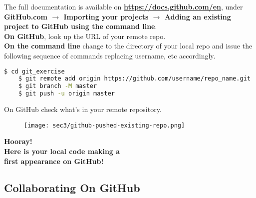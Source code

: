 \begin{frame}[fragile]
\emptyframetitle


  The full documentation is available on \textbf{\url{https://docs.github.com/en}}, under \textbf{GitHub.com $\rightarrow$ Importing your projects $\rightarrow$ Adding an existing project to GitHub using the command line}.\\[0.25cm]

  \textbf{On GitHub}, look up the URL of your remote repo.\\[0.25cm]

  \textbf{On the command line} change to the directory of your local repo and issue the following sequence of commands replacing username, etc accordingly.
  \begin{lstlisting}[language=bash]
    $ cd git_exercise
    $ git remote add origin https://github.com/username/repo_name.git
    $ git branch -M master
    $ git push -u origin master
  \end{lstlisting}

\end{frame}


\begin{frame}[fragile]
\emptyframetitle

  On GitHub check what's in your remote repository.
  \begin{figure}[h]
    \texttt{[image: sec3/github-pushed-existing-repo.png]}
  \end{figure}
  \vspace*{-2.5cm}
  \textbf{Hooray!\\[0.25cm] Here is your local code making a\\ first appearance on GitHub!}

\end{frame}


\subsection{Collaborating On GitHub}\hypertarget{sec3.2}{}


